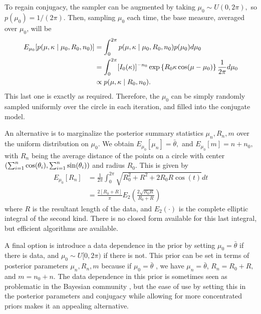 To regain conjugacy, the sampler can be augmented by taking $\mu_0 \sim U(0, 2\pi),$ so $p(\mu_0) = 1 / (2\pi).$ Then, sampling $\mu_0$ each time, the base measure, averaged over $\mu_0$, will be
\begin{align}
E_{\mu_0}[p(\mu, \kappa \mid \mu_0, R_0, n_0)]
&= \int_0^{2\pi} p(\mu, \kappa \mid \mu_0, R_0, n_0) p(\mu_0) d\mu_0 \\
&= \int_0^{2\pi} [I_0(\kappa)]^{-n_0} \exp\left\{ R_0 \kappa \cos(\mu - \mu_0)\right\} \frac{1}{2\pi} d\mu_0 \\
&\propto p(\mu, \kappa \mid R_0, n_0).
\end{align}
This last one is exactly as required. Therefore, the $\mu_0$ can be simply randomly sampled uniformly over the circle in each iteration, and filled into the conjugate model.

An alternative is to marginalize the posterior summary statistics $\mu_n, R_n, m$ over the uniform distribution on $\mu_0.$ We obtain $E_{\mu_0}[\mu_n] = \bar\theta,$ and $E_{\mu_0}[m] = n + n_0,$ with $R_n$ being the average distance of the points on a circle with center $(\sum_{i=1}^n \cos(\theta_i), \sum_{i=1}^n \sin(\theta_i))$ and radius $R_0.$ This is given by
\begin{align}
E_{\mu_0}[R_n] &= \frac{1}{2\pi} \int_{0}^{2\pi} \sqrt{R_0^2 + R^2 + 2 R_0 R \cos(t)} dt \\
&= \frac{2 [R_0 + R]}{\pi}  E_2\left( \frac{2 \sqrt{R_0 R}}{R_0 + R} \right)
\end{align}
where $R$ is the resultant length of the data, and $E_2(\cdot)$ is the complete elliptic integral of the second kind. There is no closed form available for this last integral, but efficient algorithms are available.

A final option is introduce a data dependence in the prior by setting \(\mu_0 = \bar{\theta}\) if there is data, and \(\mu_0 \sim U[0, 2\pi)\) if there is not. This prior can be set in terms of posterior parameters \(\mu_n, R_n, m\) because if $\mu_0 = \bar\theta$ , we have  $\mu_n = \bar\theta$, $R_n = R_0 + R,$ and $m = n_0 + n.$ The data dependence in this prior is sometimes seen as problematic in the Bayesian community \citep{darnieder2011bayesian}, but the ease of use by setting this in the posterior parameters and conjugacy while allowing for more concentrated priors makes it an appealing alternative.



